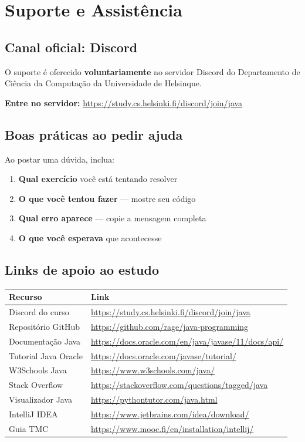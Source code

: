 \documentclass[11pt,a4paper]{article}
\begin{document}
\section{Suporte e Assistência}

\subsection{Canal oficial: Discord}

O suporte é oferecido \textbf{voluntariamente} no servidor Discord do Departamento de Ciência da Computação da Universidade de Helsinque.

\textbf{Entre no servidor:}
\url{https://study.cs.helsinki.fi/discord/join/java}

\subsection{Boas práticas ao pedir ajuda}

Ao postar uma dúvida, inclua:

\begin{enumerate}
  \item \textbf{Qual exercício} você está tentando resolver
  \item \textbf{O que você tentou fazer} — mostre seu código
  \item \textbf{Qual erro aparece} — copie a mensagem completa
  \item \textbf{O que você esperava} que acontecesse
\end{enumerate}

\subsection{Links de apoio ao estudo}

\begin{center}
\begin{tabular}{l l}
\toprule
\textbf{Recurso} & \textbf{Link} \\
\midrule
Discord do curso        & \url{https://study.cs.helsinki.fi/discord/join/java} \\
Repositório GitHub      & \url{https://github.com/rage/java-programming} \\
Documentação Java       & \url{https://docs.oracle.com/en/java/javase/11/docs/api/} \\
Tutorial Java Oracle    & \url{https://docs.oracle.com/javase/tutorial/} \\
W3Schools Java          & \url{https://www.w3schools.com/java/} \\
Stack Overflow          & \url{https://stackoverflow.com/questions/tagged/java} \\
Visualizador Java       & \url{https://pythontutor.com/java.html} \\
IntelliJ IDEA           & \url{https://www.jetbrains.com/idea/download/} \\
Guia TMC                & \url{https://www.mooc.fi/en/installation/intellij/} \\
\bottomrule
\end{tabular}
\end{center}
\end{document}
